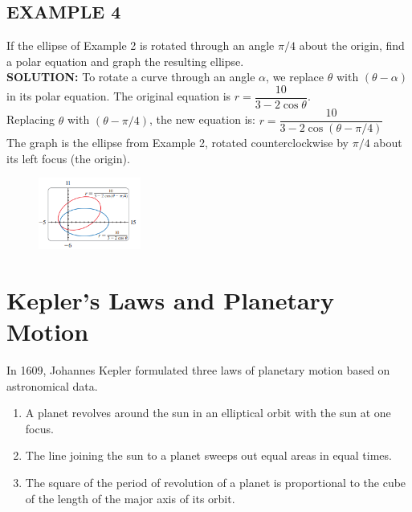 \documentclass{article}
\begin{document}
\subsection*{EXAMPLE 4}
If the ellipse of Example 2 is rotated through an angle $\pi/4$ about the origin, find a polar equation and graph the resulting ellipse.\\
\textbf{SOLUTION:}
To rotate a curve through an angle $\alpha$, we replace $\theta$ with $(\theta - \alpha)$ in its polar equation. The original equation is $r = \dfrac{10}{3 - 2 \cos\theta}$.\\
Replacing $\theta$ with $(\theta - \pi/4)$, the new equation is:
$r = \dfrac{10}{3 - 2 \cos(\theta - \pi/4)}$\\
The graph is the ellipse from Example 2, rotated counterclockwise by $\pi/4$ about its left focus (the origin).
\begin{figure}[htbp]
    \centering
    \includegraphics[width=0.3\textwidth]{graph64.png}
\end{figure}

\section*{Kepler's Laws and Planetary Motion}
In 1609, Johannes Kepler formulated three laws of planetary motion based on astronomical data.
\begin{tcolorbox}[
    colback=white!,   %
    colframe=orange!80!white, %
    title=Kepler's Laws,   %
    boxrule=0.5mm,          %
    arc=3mm               %
    ]
    \begin{enumerate}
        \item A planet revolves around the sun in an elliptical orbit with the sun at one focus.
        \item The line joining the sun to a planet sweeps out equal areas in equal times.
        \item The square of the period of revolution of a planet is proportional to the cube of the length of the major axis of its orbit.
    \end{enumerate}
\end{tcolorbox}
\end{document}
